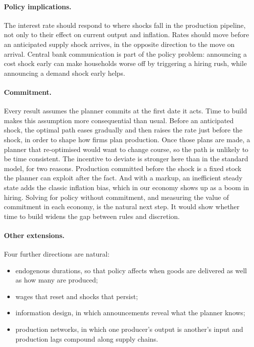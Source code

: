 \documentclass[11pt]{article}
\theoremstyle{definition}
\begin{document}
\paragraph{Policy implications.} The interest rate should respond to where shocks fall in the
production pipeline, not only to their effect on current output and inflation. Rates should move
before an anticipated supply shock arrives, in the opposite direction to the move on arrival. Central
bank communication is part of the policy problem: announcing a cost shock early can make households
worse off by triggering a hiring rush, while announcing a demand shock early helps.

\paragraph{Commitment.} Every result assumes the planner commits at the first date it acts. Time to
build makes this assumption more consequential than usual. Before an anticipated shock, the optimal
path eases gradually and then raises the rate just before the shock, in order to shape how firms plan
production. Once those plans are made, a planner that re-optimised would want to change course, so
the path is unlikely to be time consistent. The incentive to deviate is stronger here than in the
standard model, for two reasons. Production committed before the shock is a fixed stock the planner can
exploit after the fact. And with a markup, an inefficient steady state adds the classic inflation
bias, which in our economy shows up as a boom in hiring. Solving for policy without commitment, and
measuring the value of commitment in each economy, is the natural next step. It would show whether
time to build widens the gap between rules and discretion.

\paragraph{Other extensions.} Four further directions are natural:
\begin{itemize}
  \item endogenous durations, so that policy affects when goods are delivered as well as how many are
        produced;
  \item wages that reset and shocks that persist;
  \item information design, in which announcements reveal what the planner knows;
  \item production networks, in which one producer's output is another's input and production
        lags compound along supply chains.
\end{itemize}
\end{document}
